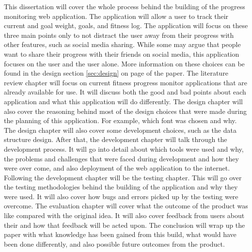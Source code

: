 This dissertation will cover the whole process behind the building of the progress monitoring web application. The application will allow a user to track their current and goal weight, goals, and fitness log. The application will focus on these three main points only to not distract the user away from their progress with other features, such as social media sharing. While some may argue that people want to share their progress with their friends on social media, this application focuses on the user and the user alone. More information on these choices can be found in the design section \ref{sec:design} on page \pageref{sec:design} of the paper. The literature review chapter will focus on current fitness progress monitor applications that are already available for use. It will discuss both the good and bad points about each application and what this application will do differently. The design chapter will also cover the reasoning behind most of the design choices that were made during the planning of this application. For example, which font was chosen and why. The design chapter will also cover some development choices, such as the data structure design. After that, the development chapter will talk through the development process. It will go into detail about which tools were used and why, the problems and challenges that were faced during development and how they were over come, and also deployment of the web application to the internet. Following the development chapter will be the testing chapter. This will go over the testing methodologies behind the building of the application and why they were used. It will also cover how bugs and errors picked up by the testing were overcome. The evaluation chapter will cover what the outcome of the product was like compared with the original idea. It will also cover feedback from users about their and how that feedback will be acted upon. The conclusion will wrap up the paper with what knowledge has been gained from this build, what would have been done differently, and also possible future outcomes from the product.